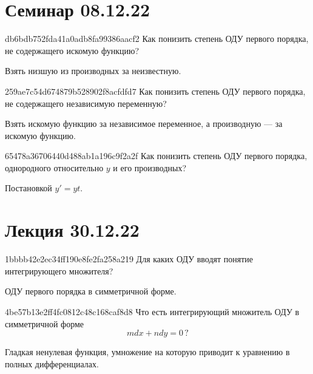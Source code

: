 \section{Семинар 08.12.22}
\begin{note}{db6bdb752fda41a0adb8fa99386aacf2}
    Как понизить степень ОДУ первого порядка, не содержащего искомую функцию?

    \begin{cloze}{1}
        Взять низшую из производных за неизвестную.
    \end{cloze}
\end{note}

\begin{note}{259ae7c54d674879b528902f8acfdfd7}
    Как понизить степень ОДУ первого порядка, не содержащего независимую переменную?

    \begin{cloze}{1}
        Взять искомую функцию за независимое переменное, а производную --- за искомую функцию.
    \end{cloze}
\end{note}

\begin{note}{65478a36706440d488ab1a196c9f2a2f}
    Как понизить степень ОДУ первого порядка, однородного относительно \({ y }\) и его производных?

    \begin{cloze}{1}
        Постановкой \({ y' = yt }\).
    \end{cloze}
\end{note}

\section{Лекция 30.12.22}
\begin{note}{1bbbb42e2ec34ff190e8fe2fa258a219}
    Для каких ОДУ вводят понятие интегрирующего множителя?

    \begin{cloze}{1}
        ОДУ первого порядка в симметричной форме.
    \end{cloze}
\end{note}

\begin{note}{4be57b13e2ff4fc0812c48c168caf8d8}
    Что есть интегрирующий множитель ОДУ в симметричной форме
    \[
        m dx + n dy = 0\,?
    \]

    \begin{cloze}{1}
        Гладкая ненулевая функция, умножение на которую приводит к уравнению в полных дифференциалах.
    \end{cloze}
\end{note}

